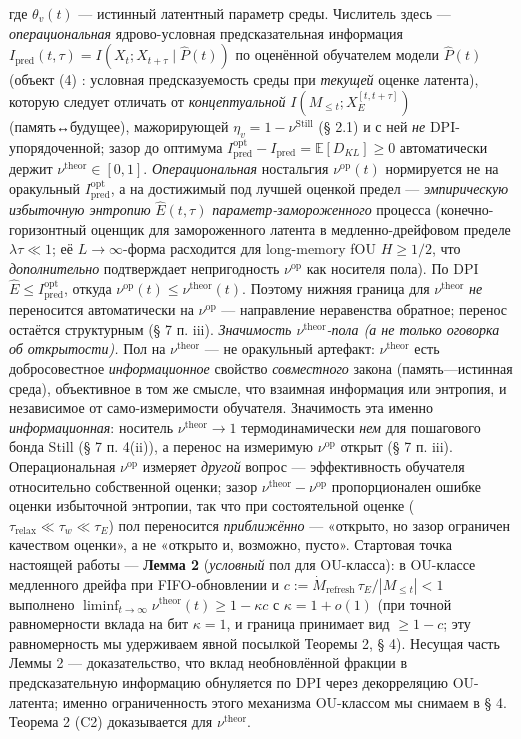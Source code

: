 \documentclass[12pt]{iopart}
\begin{document}
где \(\theta_v(t)\) --- истинный латентный параметр среды. Числитель здесь --- \emph{операциональная} ядрово-условная предсказательная информация \(I_{\text{pred}}(t,\tau) = I(X_t; X_{t+\tau} \mid \hat P(t))\) по оценённой обучателем модели \(\hat P(t)\) (объект (4) \cite{Andriishin2026b}: условная предсказуемость среды при \emph{текущей} оценке латента), которую следует отличать от \emph{концептуальной} \(I(M_{\le t}; X_E^{[t,t+\tau]})\) (память↔будущее), мажорирующей \(\eta_v = 1 - \nu^{\text{Still}}\) (§ 2.1) и с ней \emph{не} DPI-упорядоченной; зазор до оптимума \(I_{\text{pred}}^{\text{opt}} - I_{\text{pred}} = \mathbb{E}[D_{KL}] \ge 0\) автоматически держит \(\nu^{\text{theor}} \in [0,1]\). \emph{Операциональная} ностальгия \(\nu^{\text{op}}(t)\) нормируется не на оракульный \(I_{\text{pred}}^{\text{opt}}\), а на достижимый под лучшей оценкой предел --- \emph{эмпирическую избыточную энтропию} \(\hat E(t,\tau)\) \cite{Andriishin2026b,CrutchfieldFeldman2003} \emph{параметр-замороженного} процесса (конечно-горизонтный оценщик для замороженного латента в медленно-дрейфовом пределе \(\lambda\tau \ll 1\); её \(L\to\infty\)-форма расходится для long-memory fOU \(H\ge1/2\), что \emph{дополнительно} подтверждает непригодность \(\nu^{\text{op}}\) как носителя пола). По DPI \(\hat E \le I_{\text{pred}}^{\text{opt}}\), откуда \(\nu^{\text{op}}(t) \le \nu^{\text{theor}}(t)\). Поэтому нижняя граница для \(\nu^{\text{theor}}\) \emph{не} переносится автоматически на \(\nu^{\text{op}}\) --- направление неравенства обратное; перенос остаётся структурным (§ 7 п. iii). \emph{Значимость \(\nu^{\text{theor}}\)-пола (а не только оговорка об открытости).} Пол на \(\nu^{\text{theor}}\) --- не оракульный артефакт: \(\nu^{\text{theor}}\) есть добросовестное \emph{информационное} свойство \emph{совместного} закона (память---истинная среда), объективное в том же смысле, что взаимная информация или энтропия, и независимое от само-измеримости обучателя. Значимость эта именно \emph{информационная}: носитель \(\nu^{\text{theor}}\to1\) термодинамически \emph{нем} для пошагового бонда Still (§ 7 п. 4(ii)), а перенос на измеримую \(\nu^{\text{op}}\) открыт (§ 7 п. iii). Операциональная \(\nu^{\text{op}}\) измеряет \emph{другой} вопрос --- эффективность обучателя относительно собственной оценки; зазор \(\nu^{\text{theor}}-\nu^{\text{op}}\) пропорционален ошибке оценки избыточной энтропии, так что при состоятельной оценке (\(\tau_{\text{relax}} \ll \tau_w \ll \tau_E\)) пол переносится \emph{приближённо} --- «открыто, но зазор ограничен качеством оценки», а не «открыто и, возможно, пусто». Стартовая точка настоящей работы --- \textbf{Лемма 2} \cite{Andriishin2026b} (\emph{условный} пол для OU-класса): в OU-классе медленного дрейфа при FIFO-обновлении и \(c := \dot M_{\text{refresh}}\,\tau_E/|M_{\le t}| < 1\) выполнено \(\liminf_{t\to\infty}\nu^{\text{theor}}(t) \ge 1 - \kappa c\) с \(\kappa = 1+o(1)\) (при точной равномерности вклада на бит \(\kappa = 1\), и граница принимает вид \(\ge 1-c\); эту равномерность мы удерживаем явной посылкой Теоремы 2, § 4). Несущая часть Леммы 2 --- доказательство, что вклад необновлённой фракции в предсказательную информацию обнуляется по DPI через декорреляцию OU-латента; именно ограниченность этого механизма OU-классом мы снимаем в § 4. Теорема 2 (C2) доказывается для \(\nu^{\text{theor}}\).
\end{document}
